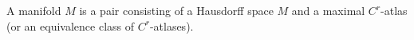 A manifold $M$ is a pair consisting of a Hausdorff space $M$ and a maximal $C^r$-atlas (or an equivalence class of $C^r$-atlases).

